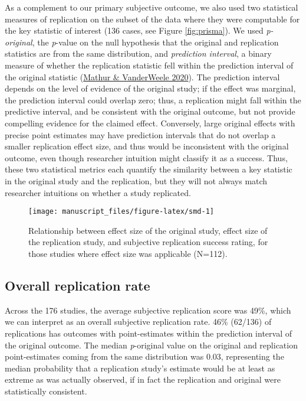 \documentclass[
  english,
  a4paper,
]{article}
\begin{document}
As a complement to our primary subjective outcome, we also used two statistical measures of replication on the subset of the data where they were computable for the key statistic of interest (136 cases, see Figure \ref{fig:prisma}). We used \emph{p-original}, the \emph{p}-value on the null hypothesis that the original and replication statistics are from the same distribution, and \emph{prediction interval}, a binary measure of whether the replication statistic fell within the prediction interval of the original statistic (\protect\hyperlink{ref-mathur2020}{Mathur \& VanderWeele 2020}). The prediction interval depends on the level of evidence of the original study; if the effect was marginal, the prediction interval could overlap zero; thus, a replication might fall within the predictive interval, and be consistent with the original outcome, but not provide compelling evidence for the claimed effect. Conversely, large original effects with precise point estimates may have prediction intervals that do not overlap a smaller replication effect size, and thus would be inconsistent with the original outcome, even though researcher intuition might classify it as a success. Thus, these two statistical metrics each quantify the similarity between a key statistic in the original study and the replication, but they will not always match researcher intuitions on whether a study replicated.

\begin{figure}[ht]
\texttt{[image: manuscript\_files/figure-latex/smd-1]} \caption{Relationship between effect size of the original study, effect size of the replication study, and subjective replication success rating, for those studies where effect size was applicable (N=112).}\label{fig:smd}
\end{figure}

\hypertarget{overall-replication-rate}{%
\subsection{Overall replication rate}\label{overall-replication-rate}}

Across the 176 studies, the average subjective replication score was 49\%, which we can interpret as an overall subjective replication rate. 46\% (62/136) of replications has outcomes with point-estimates within the prediction interval of the original outcome. The median \emph{p}-original value on the original and replication point-estimates coming from the same distribution was 0.03, representing the median probability that a replication study's estimate would be at least as extreme as was actually observed, if in fact the replication and original were statistically consistent.
\end{document}

